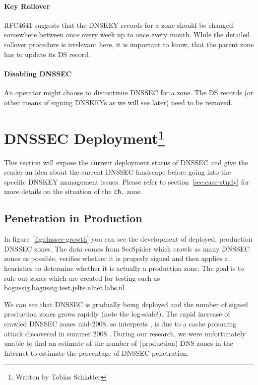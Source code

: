 \documentclass[a4paper,twocolumn]{scrartcl}
\newcommand{\wbts}{\protect\footnote{Written by Tobias Schlatter}}
\begin{document}
\paragraph{Key Rollover} RFC4641 \cite{RFC4641} suggests that the DNSKEY
records for a zone should be changed somewhere between once every week
up to once every month. While the detailed rollover procedure is
irrelevant here, it is important to know, that the parent zone has to
update its DS record.

\paragraph{Disabling DNSSEC} An operator might choose to discontinue
DNSSEC for a zone. The DS records (or other means of signing DNSKEYs
as we will see later) need to be removed.

\section{DNSSEC Deployment\wbts}

This section will expose the current deployment status of DNSSEC and
give the reader an idea about the current DNSSEC landscape before
going into the specific DNSKEY management issues. Please refer to
section~\ref{sec:case-study} for more details on the situation of the
\verb|ch.| zone.

\subsection{Penetration in Production}
In figure~\ref{fig:dnssec-growth} you can see the development of
deployed, production DNSSEC zones. The data comes from SecSpider
\cite{secspider} which crawls as many DNSSEC zones as possible,
verifies whether it is properly signed and then applies a heuristics to
determine whether it is actually a production zone. The goal is to
rule out zones which are created for testing such as
\url{bogussig.bogussig.test.jelte.nlnet.labs.nl}.

We can see that DNSSEC is gradually being deployed and the number of
signed production zones grows rapidly (note the log-scale!). The rapid
increase of crawled DNSSEC zones mid-2008, so interprets
\cite{Osterweil09}, is due to a cache poisoning attack discovered in
summer 2008 \cite{dnsVuln}. During our research, we were unfortunately
unable to find an estimate of the number of (production) DNS zones in
the Internet to estimate the percentage of DNSSEC penetration.
\end{document}
